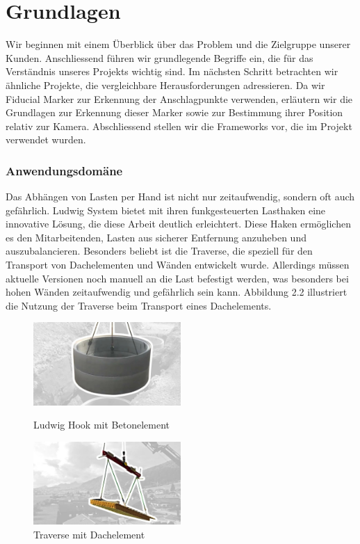 \section{Grundlagen}
Wir beginnen mit einem Überblick über das Problem und die Zielgruppe unserer Kunden.
Anschliessend führen wir grundlegende Begriffe ein, die für das Verständnis unseres Projekts
wichtig sind. Im nächsten Schritt betrachten wir ähnliche Projekte, die vergleichbare Herausforderungen adressieren.
Da wir Fiducial Marker zur Erkennung der Anschlagpunkte verwenden, erläutern wir die Grundlagen zur 
Erkennung dieser Marker sowie zur Bestimmung ihrer Position relativ zur Kamera. Abschliessend stellen wir die
Frameworks vor, die im Projekt verwendet wurden.


\subsubsection{Anwendungsdomäne}
Das Abhängen von Lasten per Hand ist nicht nur zeitaufwendig, sondern oft auch gefährlich. 
Ludwig System bietet mit ihren funkgesteuerten Lasthaken eine innovative Lösung, 
die diese Arbeit deutlich erleichtert. Diese Haken ermöglichen es den Mitarbeitenden, 
Lasten aus sicherer Entfernung anzuheben und auszubalancieren. Besonders beliebt ist 
die Traverse, die speziell für den Transport von Dachelementen und Wänden entwickelt wurde. 
Allerdings müssen aktuelle Versionen noch manuell an die Last befestigt werden, 
was besonders bei hohen Wänden zeitaufwendig und gefährlich sein kann. 
Abbildung 2.2 illustriert die Nutzung der Traverse beim Transport eines Dachelements.

\begin{figure}[H]
    \centering
    \includegraphics[width=0.5\textwidth]{graphics/Betonelement.jpg}\hfill%
    \caption{Ludwig Hook mit Betonelement}
    \centering
    \includegraphics[width=0.5\textwidth]{graphics/Traverse.jpg}
    \caption{Traverse mit Dachelement}
\end{figure}

